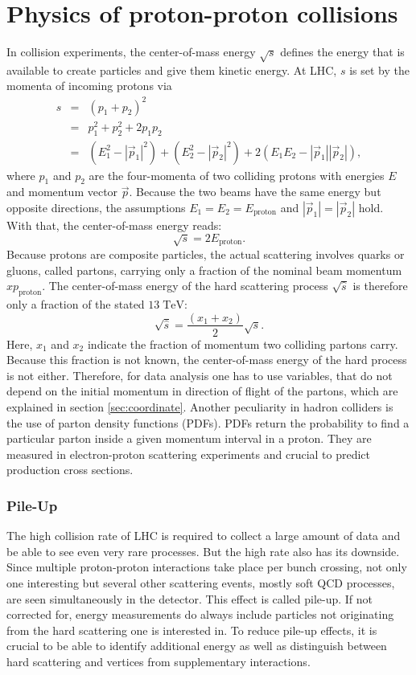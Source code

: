 \section{Physics of proton-proton collisions}
	In collision experiments, the center-of-mass energy $\sqrt{s}$ defines the energy that is available to create particles and give them kinetic energy. At LHC, $s$ is set by the momenta of incoming protons via
	\begin{eqnarray}
	s &=& (p_1 + p_2)^2 \\
	  &=& p_1^2 + p_2^2 + 2 p_1 p_2 \\
	  &=& (E_1^2 - |\vec{p}_1|^2 )  + (E_2^2 - |\vec{p}_2|^2 ) + 2 (E_1 E_2 - |\vec{p}_1| |\vec{p}_2| ),
	\end{eqnarray}
	where $p_1$ and $p_2$ are the four-momenta of two colliding protons with energies $E$ and momentum vector $\vec{p}$. Because the two beams have the same energy but opposite directions, the assumptions $E_1 = E_2 = E_\text{proton}$ and $|\vec{p}_1| = |\vec{p}_2|$ hold. With that, the center-of-mass energy reads:
	\begin{equation}
	\sqrt{s} = 2 E_\text{proton}.
	\end{equation}
	Because protons are composite particles, the actual scattering involves quarks or gluons, called partons, carrying only a fraction of the nominal beam momentum $x p_\text{proton}$. The center-of-mass energy of the hard scattering process $\sqrt{\hat{s}}$ is therefore only a fraction of the stated $13\;\text{TeV}$:
	\begin{equation}
	\sqrt{\hat{s}} = \frac{(x_1 + x_2)}{2} \sqrt{s}.
	\end{equation} 
	Here, $x_1$ and $x_2$ indicate the fraction of momentum two colliding partons carry. Because this fraction is not known, the center-of-mass energy of the hard process is not either. Therefore, for data analysis one has to use variables, that do not depend on the initial momentum in direction of flight of the partons, which are explained in section \ref{sec:coordinate}. Another peculiarity in hadron colliders is the use of parton density functions (PDFs). PDFs return the probability to find a particular parton inside a given momentum interval in a proton. They are measured in electron-proton scattering experiments \cite{pdf} and crucial to predict production cross sections.
		
\subsubsection{Pile-Up}
	The high collision rate of LHC is required to collect a large amount of data and be able to see even very rare processes. But the high rate also has its downside. Since multiple proton-proton interactions take place per bunch crossing, not only one interesting but several other scattering events, mostly soft QCD processes, are seen simultaneously in the detector. This effect is called pile-up. If not corrected for, energy measurements do always include particles not originating from the hard scattering one is interested in. To reduce pile-up effects, it is crucial to be able to identify additional energy as well as distinguish between hard scattering and vertices from supplementary interactions.
	
